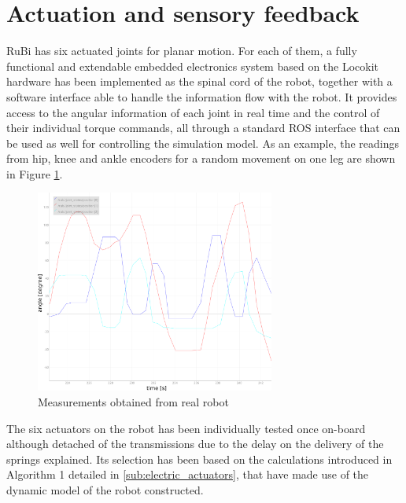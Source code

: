 

\section{Actuation and sensory feedback} %
\label{sec:actuation_and_sensory_feedback}
RuBi has six actuated joints for planar motion.
For each of them, a fully functional and extendable embedded electronics system based on the Locokit hardware has been implemented as the spinal cord of the robot, together with a software interface able to handle the information flow with the robot.
It provides access to the angular information of each joint in real time and the control of their individual torque commands, all through a standard ROS interface that can be used as well for controlling the simulation model.
As an example, the readings from hip, knee and ankle encoders for a random movement on one leg are shown in Figure \ref{fig:position_measurements}.


\begin{figure}[h]
  \centering
  \includegraphics[width=0.7\textwidth]{figures/position_measurements.pdf}
  \caption{Measurements obtained from real robot}
  \label{fig:position_measurements}
\end{figure}


The six actuators on the robot has been individually tested once on-board although detached of the transmissions due to the delay on the delivery of the springs explained.
Its selection has been based on the calculations introduced in Algorithm 1 detailed in \ref{sub:electric_actuators}, that have made use of the dynamic model of the robot constructed.

